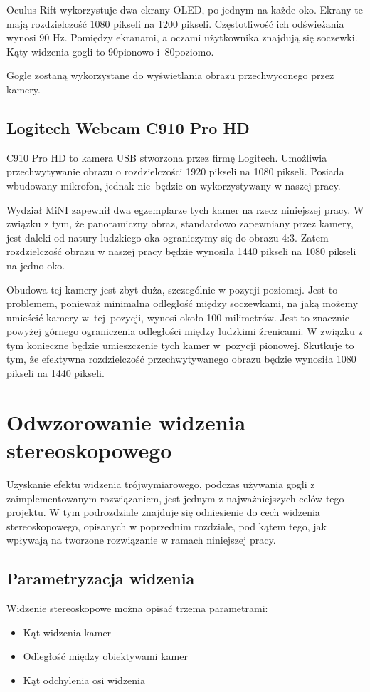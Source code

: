 \documentclass[a4paper,11pt,twoside]{report}
\theoremstyle{definition}
\begin{document}
Oculus Rift wykorzystuje dwa ekrany OLED, po jednym na każde oko. Ekrany te mają rozdzielczość 1080 pikseli na 1200 pikseli. Częstotliwość ich odświeżania wynosi 90 Hz. Pomiędzy ekranami, a oczami użytkownika znajdują się soczewki. Kąty widzenia gogli to 90\textdegree  pionowo i~80\textdegree  poziomo.

Gogle zostaną wykorzystane do wyświetlania obrazu przechwyconego przez kamery.

\subsection{Logitech Webcam C910 Pro HD}
C910 Pro HD to kamera USB stworzona przez firmę Logitech. Umożliwia przechwytywanie obrazu o rozdzielczości 1920 pikseli na 1080 pikseli. Posiada wbudowany mikrofon, jednak nie~będzie on wykorzystywany w naszej pracy.

Wydział MiNI zapewnił dwa egzemplarze tych kamer na rzecz niniejszej pracy. W związku z tym, że panoramiczny obraz, standardowo zapewniany przez kamery, jest daleki od natury ludzkiego oka ograniczymy się do obrazu 4:3. Zatem rozdzielczość obrazu w naszej pracy będzie wynosiła 1440 pikseli na 1080 pikseli na jedno oko.

Obudowa tej kamery jest zbyt duża, szczególnie w pozycji poziomej. Jest to problemem, ponieważ minimalna odległość między soczewkami, na jaką możemy umieścić kamery w~tej~pozycji, wynosi około 100 milimetrów. Jest to znacznie powyżej górnego ograniczenia odległości między ludzkimi źrenicami. W związku z tym konieczne będzie umieszczenie tych kamer w~pozycji pionowej. Skutkuje to tym, że efektywna rozdzielczość przechwytywanego obrazu będzie wynosiła 1080 pikseli na 1440 pikseli.

\section{Odwzorowanie widzenia stereoskopowego}

Uzyskanie efektu widzenia trójwymiarowego, podczas używania gogli z zaimplementowanym rozwiązaniem, jest jednym z najważniejszych celów tego projektu. W tym podrozdziale znajduje się odniesienie do cech widzenia stereoskopowego, opisanych w poprzednim rozdziale, pod kątem tego, jak wpływają na tworzone rozwiązanie w ramach niniejszej pracy. 

\subsection{Parametryzacja widzenia}
Widzenie stereoskopowe można opisać trzema parametrami:
\begin{itemize}
\item Kąt widzenia kamer
\item Odległość między obiektywami kamer
\item Kąt odchylenia osi widzenia
\end{itemize}
\end{document}
